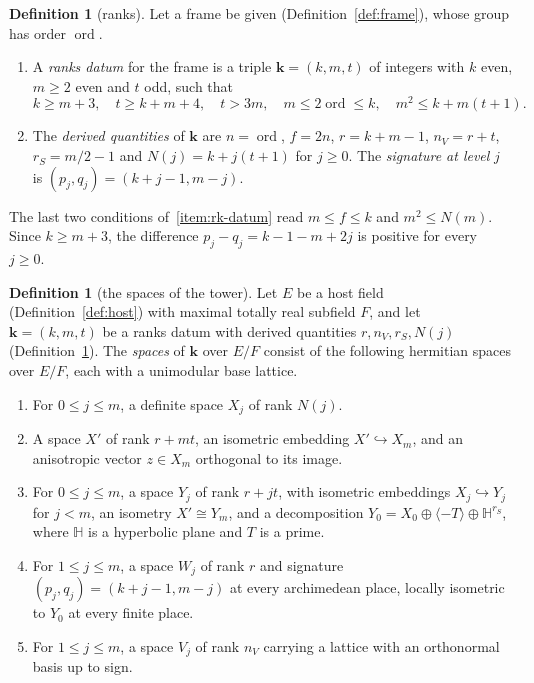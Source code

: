 \documentclass[11pt]{amsbook}
\theoremstyle{plain}
\theoremstyle{definition}
\newtheorem{definition}[theorem]{Definition}
\theoremstyle{remark}
\numberwithin{equation}{section}
\numberwithin{figure}{chapter}
\numberwithin{table}{chapter}
\begin{document}
\begin{definition}[ranks]\label{def:ranks}
Let a frame be given (Definition~\ref{def:frame}), whose group has
order $\operatorname{ord}$.
\begin{enumerate}[label=(\arabic*)]
\item\label{item:rk-datum} A \emph{ranks datum} for the frame is a triple
$\mathbf k=(k,m,t)$ of integers with $k$ even, $m\ge2$ even and $t$
odd, such that
\[
k\ge m+3,\quad t\ge k+m+4,\quad t>3m,\quad
m\le2\operatorname{ord}\le k,\quad m^2\le k+m(t+1).
\]
\item The \emph{derived quantities} of $\mathbf k$ are $n=
\operatorname{ord}$, $f=2n$, $r=k+m-1$, $n_V=r+t$, $r_S=m/2-1$ and
$N(j)=k+j(t+1)$ for $j\ge0$. The \emph{signature at level} $j$ is
$(p_j,q_j)=(k+j-1,m-j)$.
\end{enumerate}
\end{definition}

\noindent The last two conditions of~\ref{item:rk-datum} read $m\le f\le k$ and
$m^2\le N(m)$. Since $k\ge m+3$, the difference $p_j-q_j=k-1-m+2j$ is
positive for every $j\ge0$.

\begin{definition}[the spaces of the tower]\label{def:spaces}
Let $E$ be a host field (Definition~\ref{def:host}) with maximal
totally real subfield $F$, and let $\mathbf k=(k,m,t)$ be a ranks
datum with derived quantities $r,n_V,r_S,N(j)$
(Definition~\ref{def:ranks}). The \emph{spaces} of $\mathbf k$ over
$E/F$ consist of the following hermitian spaces over $E/F$, each with a
unimodular base lattice.
\begin{enumerate}[label=(\arabic*)]
\item For $0\le j\le m$, a definite space $X_j$ of rank $N(j)$.
\item A space $X'$ of rank $r+mt$, an isometric embedding
$X'\hookrightarrow X_m$, and an anisotropic vector $z\in X_m$
orthogonal to its image.
\item\label{item:sp-y}
For $0\le j\le m$, a space $Y_j$ of rank $r+jt$, with isometric
embeddings $X_j\hookrightarrow Y_j$ for $j<m$, an isometry
$X'\cong Y_m$, and a decomposition
$Y_0=X_0\oplus\langle-T\rangle\oplus\mathbb H^{r_S}$, where $\mathbb H$
is a hyperbolic plane and $T$ is a prime.
\item For $1\le j\le m$, a space $W_j$ of rank $r$ and signature
$(p_j,q_j)=(k+j-1,m-j)$ at every archimedean place, locally isometric
to $Y_0$ at every finite place.
\item For $1\le j\le m$, a space $V_j$ of rank $n_V$ carrying a lattice
with an orthonormal basis up to sign.
\end{enumerate}
\end{definition}
\end{document}
